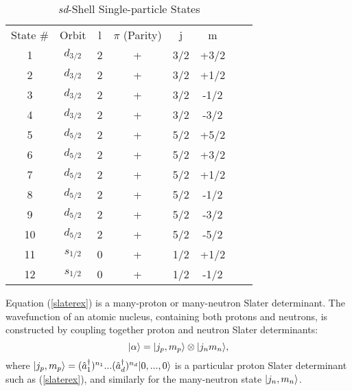 \begin{table}[h]

    \caption{\textit{sd}-Shell Single-particle States}
    \label{sdstates}
\begin{tabular}
    {c c c c c c c c}
    \hline 
    \hline
State \# & Orbit & l & $\pi$ (Parity) & j & m \\
1       & $d_{3/2}$ & 2 & + & 3/2 & +3/2 \\
2       & $d_{3/2}$ & 2 & + & 3/2 & +1/2 \\
3       & $d_{3/2}$ & 2 & + & 3/2 & -1/2 \\
4       & $d_{3/2}$ & 2 & + & 3/2 & -3/2 \\
5       & $d_{5/2}$ & 2 & + & 5/2 & +5/2 \\
6       & $d_{5/2}$ & 2 & + & 5/2 & +3/2 \\
7       & $d_{5/2}$ & 2 & + & 5/2 & +1/2 \\
8       & $d_{5/2}$ & 2 & + & 5/2 & -1/2 \\
9       & $d_{5/2}$ & 2 & + & 5/2 & -3/2 \\
10      & $d_{5/2}$ & 2 & + & 5/2 & -5/2 \\
11      & $s_{1/2}$ & 0 & + & 1/2 & +1/2 \\
12      & $s_{1/2}$ & 0 & + & 1/2 & -1/2 \\
    \hline
    \hline
\end{tabular}

\end{table} 

Equation (\ref{slaterex}) is a many-proton or many-neutron Slater determinant. The
wavefunction of an atomic nucleus, containing both protons and neutrons, is 
constructed by coupling together proton and neutron Slater determinants:
\begin{equation}\label{abasis}
    |\alpha\rangle = |j_p,m_p\rangle\otimes|j_nm_n\rangle,
\end{equation}
where $|j_p,m_p\rangle=(\hat{a}^\dagger_1)^{n_1}...(\hat{a}^\dagger_d)^{n_d}|0,...,0\rangle$ 
is a particular proton Slater determinant such as (\ref{slaterex}), and similarly 
for the many-neutron state $|j_n,m_n\rangle$. 

